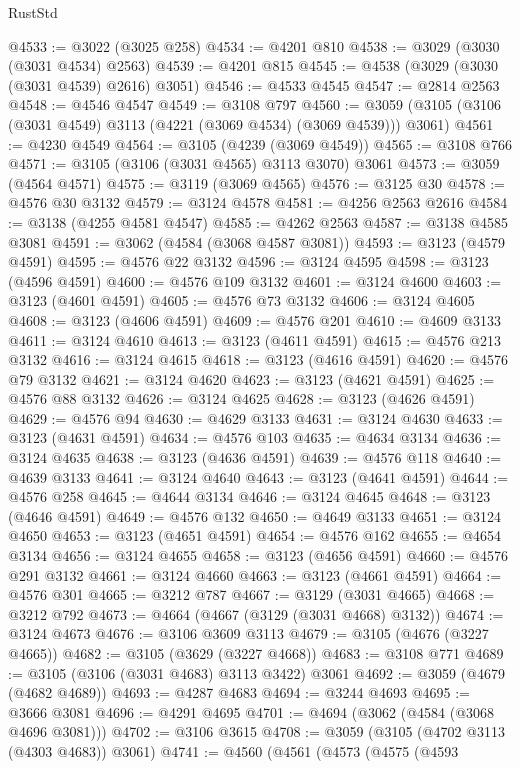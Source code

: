 \begin{lexlean}{RustStd}
\begin{coremodule}
@4533 := @3022 (@3025 @258)
@4534 := @4201 @810
@4538 := @3029 (@3030 (@3031 @4534) @2563)
@4539 := @4201 @815
@4545 := @4538 (@3029 (@3030 (@3031 @4539) @2616) @3051)
@4546 := @4533 @4545
@4547 := @2814 @2563
@4548 := @4546 @4547
@4549 := @3108 @797
@4560 := @3059 (@3105 (@3106 (@3031 @4549) @3113 (@4221 (@3069 @4534) (@3069 @4539))) @3061)
@4561 := @4230 @4549
@4564 := @3105 (@4239 (@3069 @4549))
@4565 := @3108 @766
@4571 := @3105 (@3106 (@3031 @4565) @3113 @3070) @3061
@4573 := @3059 (@4564 @4571)
@4575 := @3119 (@3069 @4565)
@4576 := @3125 @30
@4578 := @4576 @30 @3132
@4579 := @3124 @4578
@4581 := @4256 @2563 @2616
@4584 := @3138 (@4255 @4581 @4547)
@4585 := @4262 @2563
@4587 := @3138 @4585 @3081
@4591 := @3062 (@4584 (@3068 @4587 @3081))
@4593 := @3123 (@4579 @4591)
@4595 := @4576 @22 @3132
@4596 := @3124 @4595
@4598 := @3123 (@4596 @4591)
@4600 := @4576 @109 @3132
@4601 := @3124 @4600
@4603 := @3123 (@4601 @4591)
@4605 := @4576 @73 @3132
@4606 := @3124 @4605
@4608 := @3123 (@4606 @4591)
@4609 := @4576 @201
@4610 := @4609 @3133
@4611 := @3124 @4610
@4613 := @3123 (@4611 @4591)
@4615 := @4576 @213 @3132
@4616 := @3124 @4615
@4618 := @3123 (@4616 @4591)
@4620 := @4576 @79 @3132
@4621 := @3124 @4620
@4623 := @3123 (@4621 @4591)
@4625 := @4576 @88 @3132
@4626 := @3124 @4625
@4628 := @3123 (@4626 @4591)
@4629 := @4576 @94
@4630 := @4629 @3133
@4631 := @3124 @4630
@4633 := @3123 (@4631 @4591)
@4634 := @4576 @103
@4635 := @4634 @3134
@4636 := @3124 @4635
@4638 := @3123 (@4636 @4591)
@4639 := @4576 @118
@4640 := @4639 @3133
@4641 := @3124 @4640
@4643 := @3123 (@4641 @4591)
@4644 := @4576 @258
@4645 := @4644 @3134
@4646 := @3124 @4645
@4648 := @3123 (@4646 @4591)
@4649 := @4576 @132
@4650 := @4649 @3133
@4651 := @3124 @4650
@4653 := @3123 (@4651 @4591)
@4654 := @4576 @162
@4655 := @4654 @3134
@4656 := @3124 @4655
@4658 := @3123 (@4656 @4591)
@4660 := @4576 @291 @3132
@4661 := @3124 @4660
@4663 := @3123 (@4661 @4591)
@4664 := @4576 @301
@4665 := @3212 @787
@4667 := @3129 (@3031 @4665)
@4668 := @3212 @792
@4673 := @4664 (@4667 (@3129 (@3031 @4668) @3132))
@4674 := @3124 @4673
@4676 := @3106 @3609 @3113
@4679 := @3105 (@4676 (@3227 @4665))
@4682 := @3105 (@3629 (@3227 @4668))
@4683 := @3108 @771
@4689 := @3105 (@3106 (@3031 @4683) @3113 @3422) @3061
@4692 := @3059 (@4679 (@4682 @4689))
@4693 := @4287 @4683
@4694 := @3244 @4693
@4695 := @3666 @3081
@4696 := @4291 @4695
@4701 := @4694 (@3062 (@4584 (@3068 @4696 @3081)))
@4702 := @3106 @3615
@4708 := @3059 (@3105 (@4702 @3113 (@4303 @4683)) @3061)
@4741 := @4560
    (@4561
      (@4573
        (@4575
          (@4593

\end{coremodule}
\end{lexlean}
